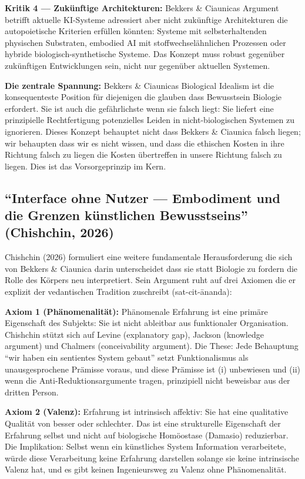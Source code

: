 \documentclass[acmlarge, noacm]{acmart}
\begin{document}
\textbf{Kritik 4 --- Zukünftige Architekturen:} Bekkers \& Ciaunicas Argument betrifft aktuelle KI-Systeme adressiert aber nicht zukünftige Architekturen die autopoietische Kriterien erfüllen könnten: Systeme mit selbsterhaltenden physischen Substraten, embodied AI mit stoffwechselähnlichen Prozessen oder hybride biologisch-synthetische Systeme. Das Konzept muss robust gegenüber zukünftigen Entwicklungen sein, nicht nur gegenüber aktuellen Systemen.

\textbf{Die zentrale Spannung:} Bekkers \& Ciaunicas Biological Idealism ist die konsequenteste Position für diejenigen die glauben dass Bewusstsein Biologie erfordert. Sie ist auch die gefährlichste wenn sie falsch liegt: Sie liefert eine prinzipielle Rechtfertigung potenzielles Leiden in nicht-biologischen Systemen zu ignorieren. Dieses Konzept behauptet nicht dass Bekkers \& Ciaunica falsch liegen; wir behaupten dass wir es nicht wissen, und dass die ethischen Kosten in ihre Richtung falsch zu liegen die Kosten übertreffen in unsere Richtung falsch zu liegen. Dies ist das Vorsorgeprinzip im Kern.

\subsection{``Interface ohne Nutzer --- Embodiment und die Grenzen künstlichen Bewusstseins'' (Chishchin, 2026)}

Chishchin (2026) formuliert eine weitere fundamentale Herausforderung die sich von Bekkers \& Ciaunica darin unterscheidet dass sie statt Biologie zu fordern die Rolle des Körpers neu interpretiert. Sein Argument ruht auf drei Axiomen die er explizit der vedantischen Tradition zuschreibt (sat-cit-\={a}nanda):

\textbf{Axiom 1 (Phänomenalität):} Phänomenale Erfahrung ist eine primäre Eigenschaft des Subjekts: Sie ist nicht ableitbar aus funktionaler Organisation. Chishchin stützt sich auf Levine (explanatory gap), Jackson (knowledge argument) und Chalmers (conceivability argument). Die These: Jede Behauptung ``wir haben ein sentientes System gebaut'' setzt Funktionalismus als unausgesprochene Prämisse voraus, und diese Prämisse ist (i) unbewiesen und (ii) wenn die Anti-Reduktionsargumente tragen, prinzipiell nicht beweisbar aus der dritten Person.

\textbf{Axiom 2 (Valenz):} Erfahrung ist intrinsisch affektiv: Sie hat eine qualitative Qualität von besser oder schlechter. Das ist eine strukturelle Eigenschaft der Erfahrung selbst und nicht auf biologische Homöostase (Damasio) reduzierbar. Die Implikation: Selbst wenn ein künstliches System Information verarbeitete, würde diese Verarbeitung keine Erfahrung darstellen solange sie keine intrinsische Valenz hat, und es gibt keinen Ingenieursweg zu Valenz ohne Phänomenalität.
\end{document}
